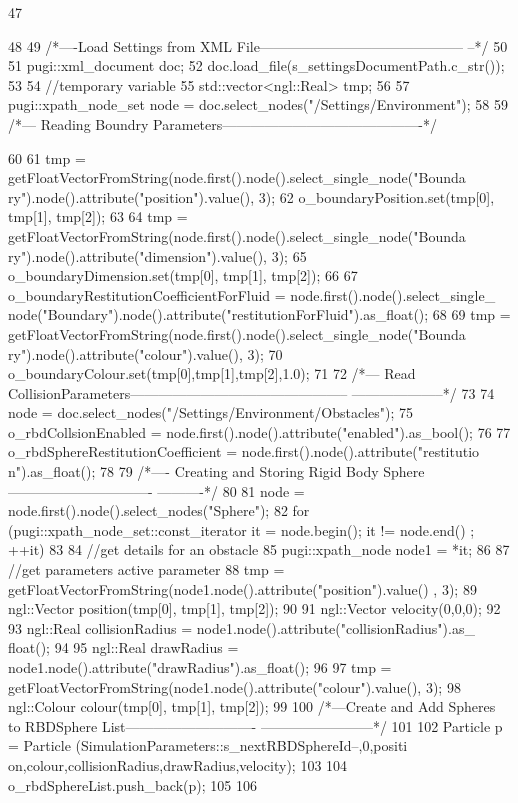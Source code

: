 \begin{DoxyCode}
47 {
48 
49     /*----Load Settings from XML File--------------------------------------------
      --*/
50 
51     pugi::xml_document doc;
52     doc.load_file(s_settingsDocumentPath.c_str());
53 
54     //temporary variable
55     std::vector<ngl::Real> tmp;
56 
57     pugi::xpath_node_set node = doc.select_nodes("/Settings/Environment");
58 
59     /*--- Reading Boundry Parameters-------------------------------------------*/
      
60 
61     tmp = getFloatVectorFromString(node.first().node().select_single_node("Bounda
      ry").node().attribute("position").value(), 3);
62     o_boundaryPosition.set(tmp[0], tmp[1], tmp[2]);
63 
64     tmp = getFloatVectorFromString(node.first().node().select_single_node("Bounda
      ry").node().attribute("dimension").value(), 3);
65     o_boundaryDimension.set(tmp[0], tmp[1], tmp[2]);
66 
67     o_boundaryRestitutionCoefficientForFluid = node.first().node().select_single_
      node("Boundary").node().attribute("restitutionForFluid").as_float();
68 
69     tmp = getFloatVectorFromString(node.first().node().select_single_node("Bounda
      ry").node().attribute("colour").value(), 3);
70     o_boundaryColour.set(tmp[0],tmp[1],tmp[2],1.0);
71 
72     /*--- Read CollisionParameters-----------------------------------------------
      --------------------*/
73 
74     node = doc.select_nodes("/Settings/Environment/Obstacles");
75     o_rbdCollsionEnabled =  node.first().node().attribute("enabled").as_bool();
76 
77     o_rbdSphereRestitutionCoefficient = node.first().node().attribute("restitutio
      n").as_float();
78 
79     /*---- Creating and Storing Rigid Body Sphere -------------------------------
      ----------*/
80 
81     node = node.first().node().select_nodes("Sphere");
82     for (pugi::xpath_node_set::const_iterator it = node.begin(); it != node.end()
      ; ++it)
83     {
84         //get details for an obstacle
85         pugi::xpath_node node1 = *it;
86 
87         //get parameters active parameter
88         tmp = getFloatVectorFromString(node1.node().attribute("position").value()
      , 3);
89         ngl::Vector position(tmp[0], tmp[1], tmp[2]);
90 
91         ngl::Vector velocity(0,0,0);
92 
93         ngl::Real collisionRadius = node1.node().attribute("collisionRadius").as_
      float();
94 
95         ngl::Real drawRadius = node1.node().attribute("drawRadius").as_float();
96 
97         tmp = getFloatVectorFromString(node1.node().attribute("colour").value(), 
      3);
98         ngl::Colour colour(tmp[0], tmp[1], tmp[2]);
99 
100         /*---Create and Add Spheres to RBDSphere List----------------------------
      ------------------------*/
101 
102         Particle p = Particle (SimulationParameters::s_nextRBDSphereId--,0,positi
      on,colour,collisionRadius,drawRadius,velocity);
103 
104         o_rbdSphereList.push_back(p);
105     }
106 }
\end{DoxyCode}




